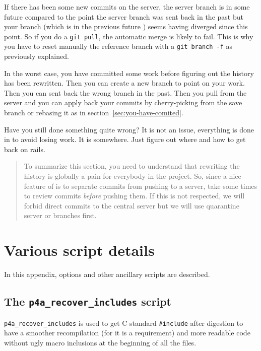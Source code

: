 \documentclass[a4paper]{article}
\begin{document}
If there has been some new commits on the server, the server branch is in
some future compared to the point the server branch was sent back in the
past but your branch (which is in the previous future \smiley) seems
having diverged since this point. So if you do a \texttt{git pull}, the
automatic merge is likely to fail. This is why you have to reset manually
the reference branch with a \texttt{git branch -f} as previously
explained.

In the worst case, you have committed some work before figuring out the
history has been rewritten. Then you can create a new branch to point on
your work. Then you can sent back the wrong branch in the past. Then you
pull from the server and you can apply back your commits by cherry-picking
from the save branch or rebasing it as in
section~\ref{sec:you-have-comited}.

Have you still done something quite wrong? It is not an issue, everything
is done in \Agit to avoid losing work. It is somewhere. Just figure out
where and how to get back on rails. \smiley

\begin{quote}
  To summarize this section, you need to understand that rewriting the
  history is globally a pain for everybody in the project. So, since a
  nice feature of \Agit is to separate commits from pushing to a server,
  take some times to review commits \emph{before} pushing them. If this is
  not respected, we will forbid direct commits to the central server but
  we will use quarantine server or branches first.
\end{quote}


\appendix

\section{Various script details}
\label{sec:vari-script-deta}

In this appendix, options and other ancillary scripts are described.

\subsection{The \protect\texttt{p4a\_recover\_includes} script}
\label{sec:p4a_recover_includes}

\verb|p4a_recover_includes| is used to get C standard \verb|#include|
after \Apips digestion to have a smoother recompilation (for \Acuda it is a
requirement) and more readable code without ugly macro inclusions at
the beginning of all the files.
\end{document}
